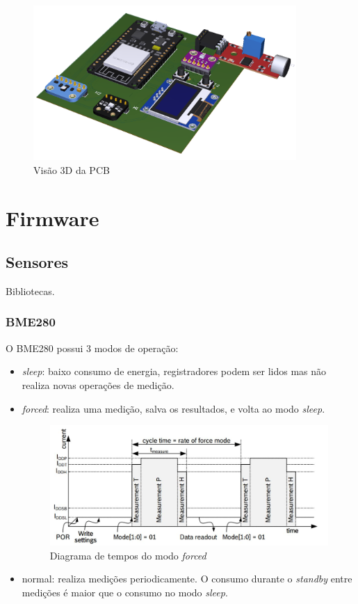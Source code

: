 \documentclass[../monografia.tex]{subfiles}
\begin{document}
\begin{figure}[h!]
\centering
\includegraphics[width=10cm]{pcb}
\caption{Visão 3D da PCB}
\label{fig:img4}
\end{figure}


\section{Firmware}
\subsection{Sensores}

Bibliotecas.

\subsubsection{BME280}

O BME280 possui 3 modos de operação: \cite{bme280}
\begin{itemize}
	\item \textit{sleep}: baixo consumo de energia, registradores podem ser lidos mas não realiza novas operações de medição.
	\item \textit{forced}: realiza uma medição, salva os resultados, e volta ao modo \textit{sleep}.
	
	\begin{figure}[h]
		\centering
		\includegraphics[width=12cm]{timing_bme280}
		\caption{Diagrama de tempos do modo \textit{forced}}
		\label{fig:time_bme280}
	\end{figure}

	\item normal: realiza medições periodicamente. O consumo durante o \textit{standby} entre medições é maior que o consumo no modo \textit{sleep}. 
\end{itemize}
\end{document}
